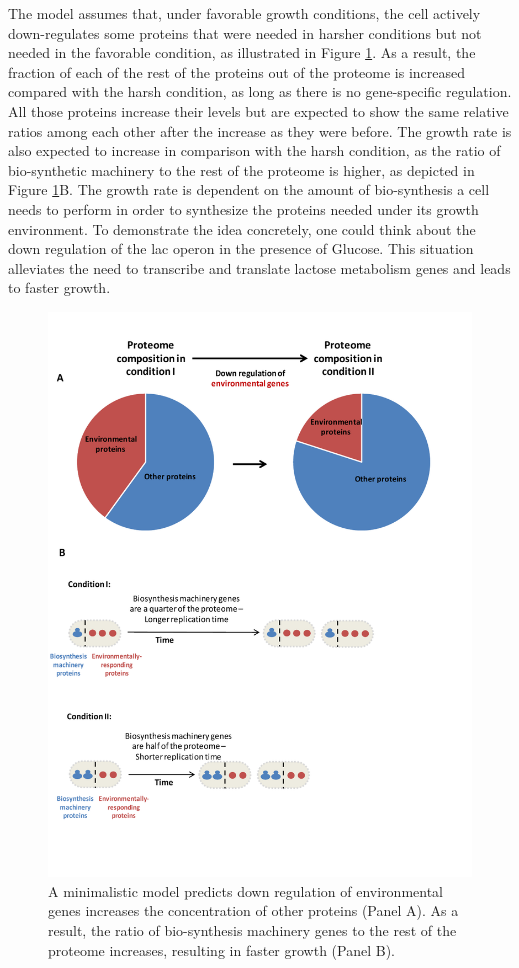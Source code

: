 \documentclass[a4paper]{article}
\begin{document}
The model assumes that, under favorable growth conditions, the cell actively down-regulates some proteins that were needed in harsher conditions but not needed in the favorable condition, as illustrated in Figure \ref{fig:model}.
As a result, the fraction of each of the rest of the proteins out of the proteome is increased compared with the harsh condition, as long as there is no gene-specific regulation. All those proteins increase their levels but are expected to show the same relative ratios among each other after the increase as they were before. 
The growth rate is also expected to increase in comparison with the harsh condition, as the ratio of bio-synthetic machinery to the rest of the proteome is higher, as  depicted in Figure \ref{fig:model}B.
The growth rate is dependent on the amount of bio-synthesis a cell needs to perform in order to synthesize the proteins needed under its growth environment. 
To demonstrate the idea concretely, one could think about the down regulation of the lac operon in the presence of Glucose. This situation alleviates the need to transcribe and translate lactose metabolism genes and leads to faster growth.

\begin{figure}[H]
\begin{center}
\includegraphics[width=0.84\columnwidth]{Figures7-trieste.pdf}
\caption{\label{fig:model}
  A minimalistic model predicts down regulation of environmental genes increases the concentration of other proteins (Panel A).
As a result, the ratio of bio-synthesis machinery genes to the rest of the proteome increases, resulting in faster growth (Panel B).
}
\end{center}
\end{figure}
\end{document}

